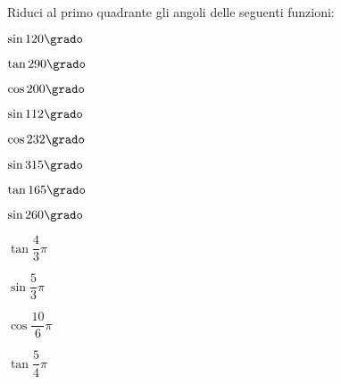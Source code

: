 \begin{esercizio}
\begin{enumeratea}
 \end{enumeratea}
\end{esercizio}


\subsubsection*{}

\begin{esercizio}\label{ese:03.1}
Riduci al primo quadrante gli angoli delle seguenti funzioni:
\begin{multicols}{4}
 \begin{enumeratea}
  \item $\sin 120 \grado$
   \hfill
  \item $\tan 290 \grado$
   \hfill
  \item $\cos 200 \grado$ 
   \hfill
  \item $\sin 112 \grado$ 
   \hfill
  \item $\cos 232 \grado$ 
   \hfill
  \item $\sin 315 \grado$ 
   \hfill
  \item $\tan 165 \grado$ 
   \hfill
  \item $\sin 260 \grado$ 
   \hfill
  \item $\tan \dfrac{4}{3}\pi$ 
   \hfill
  \item $\sin \dfrac{5}{3}\pi$ 
   \hfill
  \item $\cos \dfrac{10}{6}\pi$ 
   \hfill
  \item $\tan \dfrac{5}{4}\pi$ 
   \hfill
 \end{enumeratea}
 \end{multicols}
\end{esercizio}

